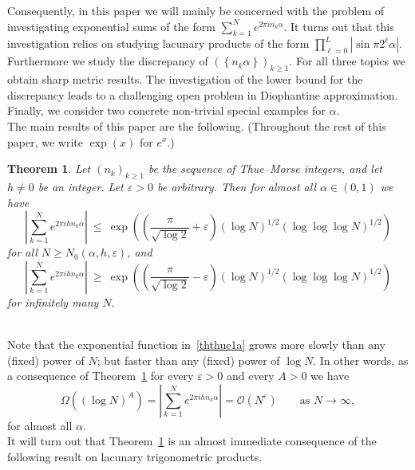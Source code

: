 \documentclass[12pt]{amsart}
\newtheorem{theorem}{Theorem}
\newcommand {\ve} {\varepsilon}
\begin{document}
Consequently, in this paper we will mainly be concerned with the problem of investigating exponential sums of the form $\sum^{N}_{k=1} e^{2 \pi i n_{k} \alpha}$. It turns out that this investigation relies on studying lacunary products of the form $\prod^{L}_{\ell=0} \left|\sin \pi 2^{\ell} \alpha\right|$. Furthermore we study the discrepancy of $\left(\left\{n_{k} \alpha\right\}\right)_{k\geq 1}$. For all three topics we obtain sharp metric results. The investigation of the lower bound for the discrepancy leads to a challenging open problem in Diophantine approximation. 
Finally, we consider two concrete non-trivial special examples for $\alpha$.\\

The main results of this paper are the following. (Throughout the rest of this paper, we write $\exp(x)$ for $e^x$.)\\

\begin{theorem} \label{th_thue}
Let $(n_k)_{k \geq 1}$ be the sequence of Thue--Morse integers, and let $h \neq 0$ be an integer. Let $\ve>0$ be arbitrary. Then for almost all $\alpha \in (0,1)$ we have
\begin{equation} \label{ththue1a}
\left|\sum_{k=1}^N e^{2 \pi i h n_k \alpha}\right| ~\leq~ \exp\left(\left(\frac{\pi}{\sqrt{\log 2}}+\ve\right) (\log N)^{1/2} (\log \log \log N)^{1/2}\right)
\end{equation} 
for all $N \geq N_0 (\alpha,h, \ve)$, and 
\begin{equation} \label{ththue1b}
\left|\sum_{k=1}^N e^{2 \pi i h n_k \alpha} \right| ~\geq~ \exp \left(\left(\frac{\pi}{\sqrt{\log 2}}-\ve\right) (\log N)^{1/2} (\log \log \log N)^{1/2}\right)
\end{equation}
for infinitely many $N$.
\end{theorem}
~\\

Note that the exponential function in~\eqref{ththue1a} grows more slowly than any (fixed) power of $N$; but faster than any (fixed) power of $\log N$. In other words, as a consequence of Theorem~\ref{th_thue} for every $\ve>0$ and every $A > 0$ we have
$$
\Omega \left(\left(\log N\right)^{A}\right) = \left|\sum_{k=1}^N e^{2 \pi i h n_k \alpha}\right| = \mathcal{O} \left(N^{\ve}\right) \qquad \textrm{as $N \to \infty$},
$$
for almost all $\alpha$.\\

It will turn out that Theorem~\ref{th_thue} is an almost immediate consequence of the following result on lacunary trigonometric products.\\
\end{document}
